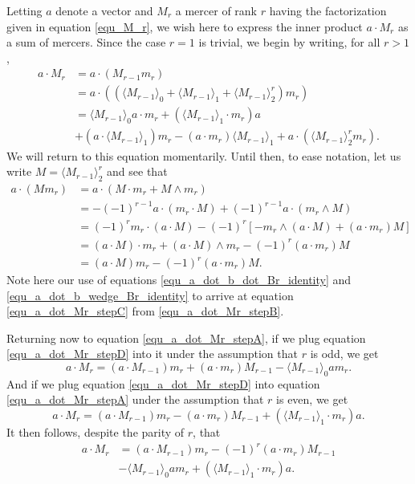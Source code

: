 \documentclass{birkjour}
\theoremstyle{definition}
\theoremstyle{remark}
\numberwithin{equation}{section}
\begin{document}
Letting $a$ denote a vector and $M_r$ a mercer of rank $r$ having the factorization
given in equation \eqref{equ_M_r},
we wish here to express the inner product $a\cdot M_r$ as a sum of mercers.
Since the case $r=1$ is trivial, we begin by writing, for all $r>1$,
\begin{align}
a\cdot M_r &= a\cdot (M_{r-1}m_r)\nonumber \\
 &= a\cdot((\langle M_{r-1}\rangle_0 + \langle M_{r-1}\rangle_1 + \langle M_{r-1}\rangle_2^r)m_r)\nonumber \\
 &= \langle M_{r-1}\rangle_0a\cdot m_r + (\langle M_{r-1}\rangle_1\cdot m_r)a\nonumber \\
 &+ (a\cdot\langle M_{r-1}\rangle_1)m_r - (a\cdot m_r)\langle M_{r-1}\rangle_1 + a\cdot(\langle M_{r-1}\rangle_2^rm_r).\label{equ_a_dot_Mr_stepA}
\end{align}
We will return to this equation momentarily.  Until then, to ease notation, let us write $M=\langle M_{r-1}\rangle_2^r$ and see that
\begin{align}
a\cdot(Mm_r)
 &= a\cdot(M\cdot m_r + M\wedge m_r)\nonumber \\
 &= -(-1)^{r-1}a\cdot(m_r\cdot M) + (-1)^{r-1}a\cdot(m_r\wedge M)\label{equ_a_dot_Mr_stepB} \\
 &= (-1)^rm_r\cdot(a\cdot M) - (-1)^r\left[-m_r\wedge(a\cdot M)+(a\cdot m_r)M\right]\label{equ_a_dot_Mr_stepC} \\
 &= (a\cdot M)\cdot m_r + (a\cdot M)\wedge m_r - (-1)^r(a\cdot m_r)M\nonumber \\
 &= (a\cdot M)m_r - (-1)^r(a\cdot m_r)M.\label{equ_a_dot_Mr_stepD}
\end{align}
Note here our use of equations \eqref{equ_a_dot_b_dot_Br_identity} and \eqref{equ_a_dot_b_wedge_Br_identity} to
arrive at equation \eqref{equ_a_dot_Mr_stepC} from \eqref{equ_a_dot_Mr_stepB}.

Returning now to equation \eqref{equ_a_dot_Mr_stepA}, if we plug equation \eqref{equ_a_dot_Mr_stepD} into it
under the assumption that $r$ is odd, we get
\begin{equation}
a\cdot M_r = (a\cdot M_{r-1})m_r + (a\cdot m_r)M_{r-1} - \langle M_{r-1}\rangle_0am_r.
\end{equation}
And if we plug equation \eqref{equ_a_dot_Mr_stepD} into equation \eqref{equ_a_dot_Mr_stepA} under the assumption
that $r$ is even, we get
\begin{equation}
a\cdot M_r = (a\cdot M_{r-1})m_r - (a\cdot m_r)M_{r-1} + (\langle M_{r-1}\rangle_1\cdot m_r)a.
\end{equation}
It then follows, despite the parity of $r$, that
\begin{align}
a\cdot M_r &= (a\cdot M_{r-1})m_r - (-1)^r(a\cdot m_r)M_{r-1}\nonumber \\
 &- \langle M_{r-1}\rangle_0am_r + (\langle M_{r-1}\rangle_1\cdot m_r)a.
\end{align}
\end{document}
